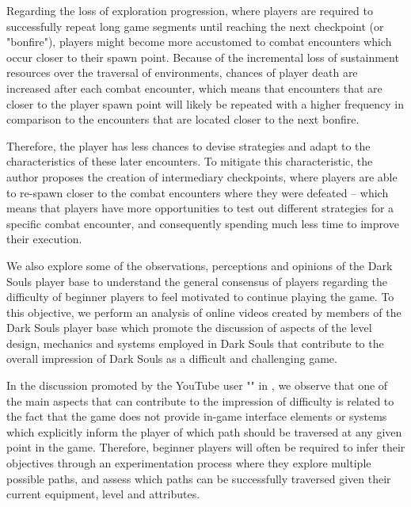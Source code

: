 Regarding the loss of exploration progression, where players are required to successfully repeat long game segments until reaching the next checkpoint (or "bonfire"), players might become more accustomed to combat encounters which occur closer to their spawn point. Because of the incremental loss of sustainment resources over the traversal of environments, chances of player death are increased after each combat encounter, which means that encounters that are closer to the player spawn point will likely be repeated with a higher frequency in comparison to the encounters that are located closer to the next bonfire.

Therefore, the player has less chances to devise strategies and adapt to the characteristics of these later encounters. To mitigate this characteristic, the author proposes the creation of intermediary checkpoints, where players are able to re-spawn closer to the combat encounters where they were defeated -- which means that players have more opportunities to test out different strategies for a specific combat encounter, and consequently spending much less time to improve their execution.

We also explore some of the observations, perceptions and opinions of the Dark Souls player base to understand the general consensus of players regarding the difficulty of beginner players to feel motivated to continue playing the game. To this objective, we perform an analysis of online videos created by members of the Dark Souls player base which promote the discussion of aspects of the level design, mechanics and systems employed in Dark Souls that contribute to the overall impression of Dark Souls as a difficult and challenging game.

In the discussion promoted by the YouTube user "\citeauthor{YT_HowChallengingIsDarkSouls}" in \citeyear{YT_HowChallengingIsDarkSouls}, we observe that one of the main aspects that can contribute to the impression of difficulty is related to the fact that the game does not provide in-game interface elements or systems which explicitly inform the player of which path should be traversed at any given point in the game. Therefore, beginner players will often be required to infer their objectives through an experimentation process where they explore multiple possible paths, and assess which paths can be successfully traversed given their current equipment, level and attributes.

